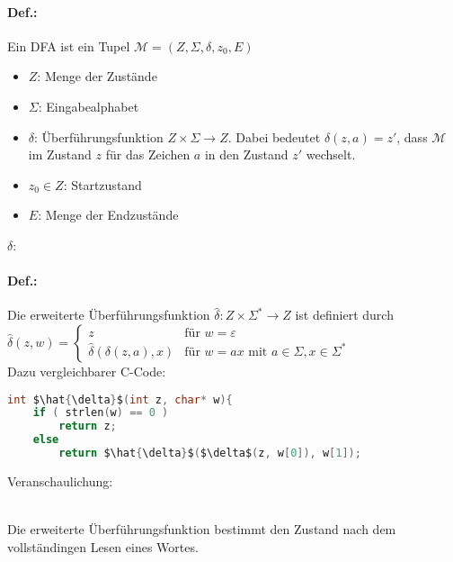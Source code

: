 \paragraph{Def.:} Ein DFA ist ein Tupel $\mathcal{M}=(Z, \Sigma, \delta, z_0, E)$
\begin{itemize}
\item $Z$: Menge der Zustände
\item $\Sigma$: Eingabealphabet
\item $\delta$: Überführungsfunktion $Z\times \Sigma \rightarrow Z$. Dabei bedeutet $\delta (z,a) = z'$, dass $\mathcal{M}$ im Zustand $z$ für das Zeichen $a$ in den Zustand $z'$ wechselt.
\item $z_0\in Z$: Startzustand
\item $E$: Menge der Endzustände
\end{itemize}
$\delta$: \\

\paragraph{Def.:} Die erweiterte Überführungsfunktion $\hat{\delta}:Z\times \Sigma^*\rightarrow Z$ ist definiert durch\\
$\hat{\delta}(z,w)=\begin{cases}
z & \text{für }w = \varepsilon\\
\hat{\delta}(\delta(z,a),x) & \text{für }w=ax \text{ mit } a\in \Sigma ,x \in \Sigma^*
\end{cases}$\\
Dazu vergleichbarer C-Code:
\begin{lstlisting}[language=C]
int $\hat{\delta}$(int z, char* w){
	if ( strlen(w) == 0 )
		return z;
	else
		return $\hat{\delta}$($\delta$(z, w[0]), w[1]);
\end{lstlisting}
Veranschaulichung:\\
\\
Die erweiterte Überführungsfunktion bestimmt den Zustand nach dem vollständingen Lesen eines Wortes.

